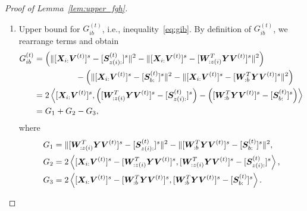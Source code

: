 \documentclass[lettersize,onecolumn,journal]{IEEEtran}
\theoremstyle{definition}
\theoremstyle{definition}
\newcommand{\of}[1]{\left(#1\right)}
\newcommand{\ang}[1]{\left\langle#1\right\rangle}
\begin{document}
\begin{proof}[Proof of Lemma~\ref{lem:upper_fgh}]
\begin{enumerate}[wide]
    Note that 
    \begin{align}
        \onormSize{}{  [  \tilde \mS_{z(i):} ]^s - [  \tilde \mS_{b:} ]^s  }^2 &=  \onormSize{}{  [  \tilde \mS_{z(i):} ]^s -[ \mS_{z(i):} ]^s +  [ \mS_{z(i):} ]^s - [ \mS_{b:} ]^s + [ \mS_{b:} ]^s -[  \tilde \mS_{b:} ]^s  }^2 \\
        & \lesssim \onormSize{}{ [ \mS_{z(i):} ]^s - [ \mS_{b:} ]^s }^2 + \max_{a \in [r]} \onormSize{}{ [ \mS_{a:} ]^s -[  \tilde \mS_{a:} ]^s }^2 \\
        & \lesssim \onormSize{}{ [ \mS_{z(i):} ]^s - [ \mS_{b:} ]^s }^2  + \max_{a \in [r]} \frac{1}{\onormSize{}{\mS_{a:} }^2} \onormSize{}{ \mW_{:a}^T \mE \mV}^2\\
        & \lesssim \onormSize{}{ [ \mS_{z(i):} ]^s - [ \mS_{b:} ]^s }^2, \label{eq:fib_2}
    \end{align}
    where the second inequality follows from Lemma~\ref{lem:norm_diff}, and the last inequality follows from the assumptions on $\onormSize{}{\mS_{a:}}$ in the parameter space~\eqref{eq:family}, the inequality~\eqref{eq:cond1} in Condition~\ref{cond:origin} and the assumption $\Delta_{\min}^2 \gtrsim p^{-K/2}\log p$. 
    
    Therefore, we finish the proof of inequality~\eqref{eq:fib} by plugging the inequalities~\eqref{eq:fib_1} and \eqref{eq:fib_2} into the upper bound~\eqref{eq:fib_decomp}.
    
    \item Upper bound for $G_{ib}^{(t)}$, i.e., inequality~\eqref{eq:gib}. By definition of $G_{ib}^{(t)}$, we rearrange terms and obtain
    \begin{align}
        G_{ib}^{(t)} &=   \of{ \onormSize{}{ [\mX_{i:} \mV^{(t)}]^s -  [  \mS_{z(i):}^{(t)}  ]^s}^2 -  \onormSize{}{ [\mX_{i:} \mV^{(t)}]^s -  [  \mW_{:z(i)}^T \mY \mV^{(t)} ]^s}^2}   \\
        & \quad \quad \quad \quad \quad -   \of{ \onormSize{}{ [\mX_{i:} \mV^{(t)}]^s -  [  \mS_{b:}^{(t)}  ]^s}^2 -  \onormSize{}{ [\mX_{i:} \mV^{(t)}]^s -  [  \mW_{:b}^T \mY \mV^{(t)} ]^s}^2 } \\
        &= 2 \ang{  [\mX_{i:} \mV^{(t)}]^s , \of{[  \mW_{:z(i)}^T \mY \mV^{(t)} ]^s -  [  \mS_{z(i):}^{(t)}  ]^s } - \of{ [  \mW_{:b}^T \mY \mV^{(t)} ]^s -  [  \mS_{b:}^{(t)}  ]^s }}\\
      &= G_1 + G_2 - G_3, \label{eq:gib_decomp}
    \end{align}
    where 
    \begin{align}
        G_1 &= \onormSize{}{ [  \mW_{:z(i)}^T \mY \mV^{(t)} ]^s -  [  \mS_{z(i):}^{(t)}  ]^s}^2 - \onormSize{}{ [  \mW_{:b}^T \mY \mV^{(t)} ]^s -  [  \mS_{b:}^{(t)}  ]^s }^2,\\
        G_2 &= 2 \ang{ [\mX_{i:} \mV^{(t)}]^s  -  [  \mW_{:z(i)}^T \mY \mV^{(t)} ]^s,   [  \mW_{:z(i)}^T \mY \mV^{(t)} ]^s -  [  \mS_{z(i):}^{(t)}  ]^s},\\
        G_3 & = 2 \ang{ [\mX_{i:} \mV^{(t)}]^s  -  [  \mW_{:b}^T \mY \mV^{(t)} ]^s,  [  \mW_{:b}^T \mY \mV^{(t)} ]^s -  [  \mS_{b:}^{(t)}  ]^s}.
    \end{align}
    

\end{enumerate}
\end{proof}
\end{document}
